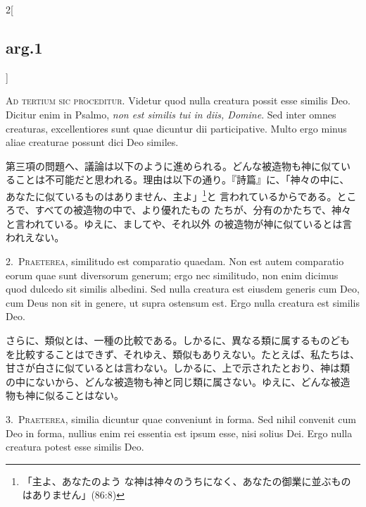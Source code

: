 \documentclass[paper=a4paper,fontsize=10pt,jafontsize=9pt,titlepage]{jlreq}
\begin{document}
\begin{paracol}{2}[\subsection{arg.1}]

{\huge A}{\scshape d tertium sic proceditur}. Videtur quod nulla
creatura possit esse similis Deo. Dicitur enim in Psalmo, {\itshape
non est similis tui in diis, Domine}. Sed inter omnes creaturas,
excellentiores sunt quae dicuntur dii participative. Multo ergo minus
aliae creaturae possunt dici Deo similes.

\switchcolumn

第三項の問題へ、議論は以下のように進められる。どんな被造物も神に似てい
ることは不可能だと思われる。理由は以下の通り。『詩篇』に、「神々の中に、
あなたに似ているものはありません、主よ」\footnote{「主よ、あなたのよう
な神は神々のうちになく、あなたの御業に並ぶものはありません」(86:8)}と
言われているからである。ところで、すべての被造物の中で、より優れたもの
たちが、分有のかたちで、神々と言われている。ゆえに、ましてや、それ以外
の被造物が神に似ているとは言われえない。


2.~{\scshape Praeterea}, similitudo est comparatio quaedam. Non est
 autem comparatio eorum quae sunt diversorum generum; ergo nec
 similitudo, non enim dicimus quod dulcedo sit similis albedini. Sed
 nulla creatura est eiusdem generis cum Deo, cum Deus non sit in
 genere, ut supra ostensum est. Ergo nulla creatura est similis Deo.

\switchcolumn

さらに、類似とは、一種の比較である。しかるに、異なる類に属するものども
を比較することはできず、それゆえ、類似もありえない。たとえば、私たちは、
甘さが白さに似ているとは言わない。しかるに、上で示されたとおり、神は類
の中にないから、どんな被造物も神と同じ類に属さない。ゆえに、どんな被造
物も神に似ることはない。


3.~{\scshape Praeterea}, similia dicuntur quae conveniunt in
 forma. Sed nihil convenit cum Deo in forma, nullius enim rei essentia
 est ipsum esse, nisi solius Dei. Ergo nulla creatura potest esse
 similis Deo.


\end{paracol}
\end{document}
